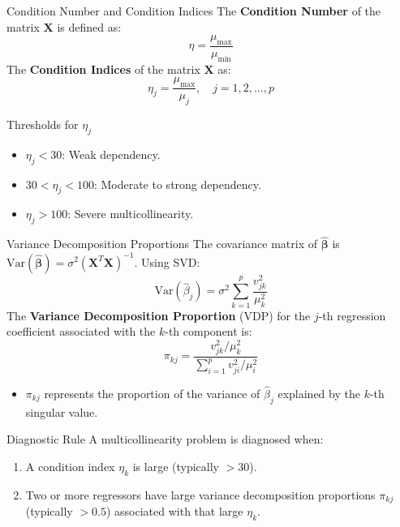 \documentclass[10pt]{beamer} %
\begin{document}
\begin{frame}{Condition Number and Condition Indices}
    The \textbf{Condition Number} of the matrix $\mathbf{X}$ is defined as:
    $$\eta = \frac{\mu_{\max}}{\mu_{\min}}$$
    The \textbf{Condition Indices} of the matrix $\mathbf{X}$  as:
    $$\eta_j = \frac{\mu_{\max}}{\mu_j}, \quad j = 1, 2, \dots, p$$
    \begin{block}{Thresholds for $\eta_j$}
        \begin{itemize}
            \item $\eta_j < 30$: Weak dependency.
            \item $30 < \eta_j < 100$: Moderate to strong dependency.
            \item $\eta_j > 100$: Severe multicollinearity.
        \end{itemize}
    \end{block}
\end{frame}

\begin{frame}{Variance Decomposition Proportions}
    The covariance matrix of $\hat{\boldsymbol{\beta}}$ is $\text{Var}(\hat{\boldsymbol{\beta}}) = \sigma^2 (\mathbf{X}^T\mathbf{X})^{-1}$. Using SVD:
    $$\text{Var}(\hat{\beta}_j) = \sigma^2 \sum_{k=1}^{p} \frac{v_{jk}^2}{\mu_k^2}$$
    The \textbf{Variance Decomposition Proportion} (VDP) for the $j$-th regression coefficient associated with the $k$-th component is:
    $$\pi_{kj} = \frac{v_{jk}^2 / \mu_k^2}{\sum_{i=1}^{p} v_{ji}^2 / \mu_i^2}$$
    \begin{itemize}
        \item $\pi_{kj}$ represents the proportion of the variance of $\hat{\beta}_j$ explained by the $k$-th singular value.
    \end{itemize}
\end{frame}

\begin{frame}{Diagnostic Rule}
    A multicollinearity problem is diagnosed when:
    \begin{enumerate}
        \item A condition index $\eta_k$ is large (typically $> 30$).
        \item Two or more regressors have large variance decomposition proportions $\pi_{kj}$ (typically $> 0.5$) associated with that large $\eta_k$.
    \end{enumerate}
\end{frame}
\end{document}
